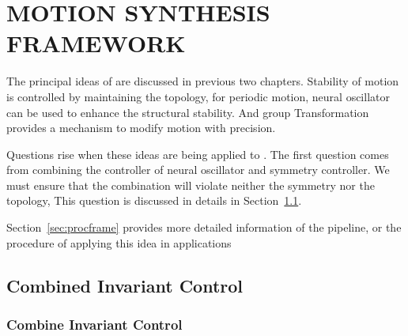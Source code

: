 \chapter {MOTION SYNTHESIS FRAMEWORK}
\label{chap:msf}
\graphicspath{{CombineFramework/CombineFrameworkFigs/EPS/}{CombineFramework/CombineFrameworkFigs/}}
The principal ideas of \moit are discussed in previous two chapters.
Stability of motion is controlled by maintaining the topology, 
for periodic motion, neural oscillator can be used to enhance the structural stability.
And group Transformation provides a mechanism to modify motion with precision.


Questions rise when these ideas are being applied  to \cms.
The first question comes from combining the controller of neural oscillator and symmetry controller.
We must ensure that the combination will violate neither the symmetry nor the topology,
This question is discussed in details in Section~\ref{sec:combin}.


Section~\ref{sec:procframe} provides more detailed information of the pipeline, or the procedure of applying this idea in \cms applications

%
%
%
%

\section{Combined Invariant Control}
\label{sec:combin}
\subsection{ Combine Invariant Control}


